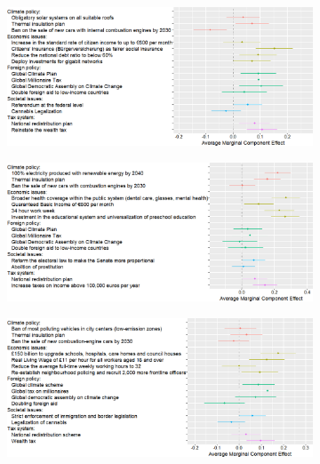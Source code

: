 \begin{figure}[h!]\ContinuedFloat %
  \begin{subfigure}{\textwidth}
    \includegraphics[width=\textwidth]{../figures/DE/ca_r_en.png}
  \end{subfigure}
  \begin{subfigure}{\textwidth}
    \includegraphics[width=\textwidth]{../figures/ES/ca_r_en.png}
  \end{subfigure}
  \begin{subfigure}{\textwidth}
    \includegraphics[width=\textwidth]{../figures/UK/ca_r.png}
  \end{subfigure}
\end{figure}
